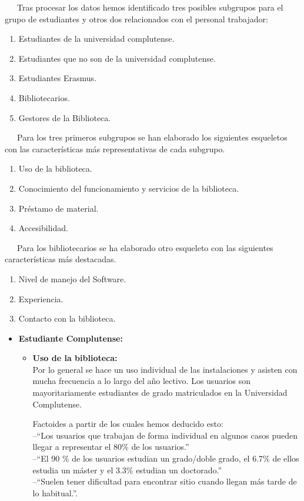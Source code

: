\documentclass[12pt]{article}
\begin{document}
\begin{itemize}
~~~Tras procesar los datos hemos identificado tres posibles subgrupos para el grupo de estudiantes y otros dos relacionados con el personal trabajador:
\begin{enumerate}
	\item Estudiantes de la universidad complutense.
	\item Estudiantes que no son de la universidad complutense.
	\item Estudiantes Erasmus.
	\item Bibliotecarios.
	\item Gestores de la Biblioteca.
\end{enumerate}

~~~Para los tres primeros subgrupos se han elaborado los siguientes esqueletos con las características más representativas de cada subgrupo.

\begin{enumerate}
	\item Uso de la biblioteca.
	\item Conocimiento del funcionamiento y servicios de la biblioteca.
	\item Préstamo de material.
	\item Accesibilidad.
\end{enumerate}

~~~Para los bibliotecarios se ha elaborado otro esqueleto con las siguientes características más destacadas.

\begin{enumerate}
	\item Nivel de manejo del Software.
	\item Experiencia.
	\item Contacto con la biblioteca.
\end{enumerate}

\begin{itemize}
	\item \textbf{Estudiante Complutense: }
	\begin{itemize}
		\item \textbf{Uso de la biblioteca: \\}
			Por lo general se hace un uso individual de las instalaciones y asisten con mucha frecuencia a lo largo del año lectivo. Los usuarios son mayoritariamente estudiantes de grado matriculados en la Universidad Complutense.

			Factoides a partir de los cuales hemos deducido esto: \\--``Los usuarios que trabajan de forma individual en algunos casos pueden llegar a representar el 80\% de los usuarios.''\\ --``El 90 \% de los usuarios estudian un grado/doble grado, el 6.7\% de ellos estudia un máster y el 3.3\% estudian un doctorado.''\\ --``Suelen tener dificultad para encontrar sitio cuando llegan más tarde de lo habitual.''.


\end{itemize}
\end{itemize}
\end{itemize}
\end{document}
